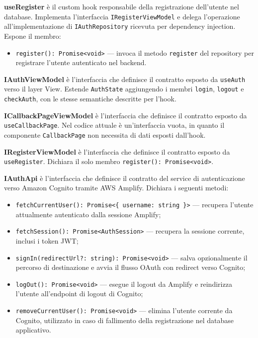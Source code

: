 \documentclass[a4paper, 11pt]{article}
\newcounter{subsubsubsection}[subsubsection]
\newcounter{subsubsubsubsection}[subsubsubsection]
\begin{document}
\textbf{useRegister} è il custom hook responsabile della registrazione dell'utente nel
database. Implementa l'interfaccia \texttt{IRegisterViewModel} e delega
l'operazione all'implementazione di \texttt{IAuthRepository} ricevuta per dependency injection.
Espone il membro:
\begin{itemize}
  \item \texttt{register(): Promise<void>} — invoca il metodo \texttt{register} del repository
        per registrare l'utente autenticato nel backend.
\end{itemize}

\textbf{IAuthViewModel} è l'interfaccia che definisce il contratto esposto da \texttt{useAuth}
verso il layer View. Estende \texttt{AuthState} aggiungendo i membri \texttt{login},
\texttt{logout} e \texttt{checkAuth}, con le stesse semantiche descritte per l'hook.

\textbf{ICallbackPageViewModel} è l'interfaccia che definisce il contratto esposto da
\texttt{useCallbackPage}. Nel codice attuale è un'interfaccia vuota, in quanto il componente
\texttt{CallbackPage} non necessita di dati esposti dall'hook.

\textbf{IRegisterViewModel} è l'interfaccia che definisce il contratto esposto da
\texttt{useRegister}. Dichiara il solo membro \texttt{register(): Promise<void>}.


\textbf{IAuthApi} è l'interfaccia che definisce il contratto del service di autenticazione
verso Amazon Cognito tramite AWS Amplify. Dichiara i seguenti metodi:
\begin{itemize}
  \item \texttt{fetchCurrentUser(): Promise<\{ username: string \}>} — recupera l'utente
        attualmente autenticato dalla sessione Amplify;
  \item \texttt{fetchSession(): Promise<AuthSession>} — recupera la sessione corrente,
        inclusi i token JWT;
  \item \texttt{signIn(redirectUrl?: string): Promise<void>} — salva opzionalmente il percorso
        di destinazione e avvia il flusso OAuth con redirect verso Cognito;
  \item \texttt{logOut(): Promise<void>} — esegue il logout da Amplify e reindirizza
        l'utente all'endpoint di logout di Cognito;
  \item \texttt{removeCurrentUser(): Promise<void>} — elimina l'utente corrente da Cognito,
        utilizzato in caso di fallimento della registrazione nel database applicativo.
\end{itemize}
\end{document}
